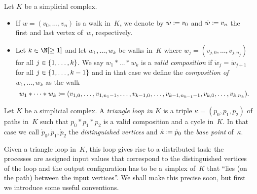 \begin{thDef}
    Let $K$ be a simplicial complex.
    \begin{itemize}
        \item
            If $w = (v_0,\dots,v_n)$ is a walk in~$K$, we denote by
            $\dot w \coloneqq v_0$ and $\ddot w \coloneqq v_n$ the first and
            last vertex of~$w$, respectively.
            
        \item
            Let $k\in\N[\geq1]$ and let $w_1,\dots,w_k$ be walks in~$K$
            where $w_j = (v_{j,0}, \dots, v_{j,n_j})$ for all $j\in\{1,\ldots,k\}$.
            We say $w_1\ast\dots\ast w_k$ is a \emph{valid composition}
            if $\ddot{w}_j = \dot{w}_{j+1}$ for all $j\in\{1,\ldots,k-1\}$ and
            in that case we define the \emph{composition of $w_1,\dots,w_k$}
            as the walk
            \[ w_1\ast\dots\ast w_k
                \coloneqq (v_{1,0},\dots,v_{1,n_1-1},
                        \dots,
                        v_{k-1,0},\dots,v_{k-1,n_{k-1}-1},
                        v_{k,0},\dots,v_{k,n_k})
            . \]
    \end{itemize}
\end{thDef}

\begin{thDef}
    Let $K$ be a simplicial complex.
    A \emph{triangle loop in $K$} is a triple $\kappa = (p_0,p_1,p_2)$ of paths
    in~$K$ such that $p_0\ast p_1\ast p_2$ is a valid composition and a cycle
    in~$K$. In that case we call $\dot{p}_0,\dot{p}_1,\dot{p}_2$ the
    \emph{distinguished vertices} and $\dot\kappa \coloneqq \dot{p}_0$ the
    \emph{base point} of~$\kappa$.
\end{thDef}

Given a triangle loop in~$K$, this loop gives rise to a distributed task:
the processes are assigned input values that correspond to the distinguished
vertices of the loop and the output configuration has to be a simplex of~$K$
that \enquote{lies (on the path) between the input vertices}. We shall make this
precise soon, but first we introduce some useful conventions.

